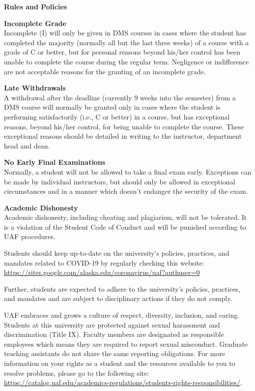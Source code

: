 \documentclass[12pt]{article}
\renewcommand{\emph}[1]{\textsf{\textbf{#1}}}
\newcommand{\localhead}[1]{\par\smallskip\textbf{#1}\nobreak\\}%
\def\heading#1{\localhead{\large\emph{#1}}}
\def\subheading#1{\localhead{\emph{#1}}}
\begin{document}
\heading{Rules and Policies}
\vskip -20pt

\subheading{Incomplete Grade} 
Incomplete (I) will only be given in
  DMS courses in cases where
  the student has completed the majority (normally all but the last
  three weeks) of a course with a grade of C or better, but for
  personal reasons beyond his/her control has been unable to complete
  the course during the regular term. Negligence or indifference are
  not acceptable reasons for the granting of an incomplete
  grade. 

\subheading{Late Withdrawals} 
A withdrawal after the deadline
  (currently 9 weeks into the semester) from a DMS course will
  normally be granted only in cases where the student is performing
  satisfactorily (i.e., C or better) in a course, but has exceptional
  reasons, beyond his/her control, for being unable to complete the
  course. These exceptional reasons should be detailed in writing to
  the instructor, department head and dean.

\subheading{No Early Final Examinations}
 Normally, a student will not be
  allowed to take a final exam early. Exceptions can be made by
  individual instructors, but should only be allowed in exceptional
  circumstances and in a manner which doesn't endanger the security of
  the exam.

\subheading{Academic Dishonesty}
Academic dishonesty, including cheating and plagiarism, will not
be tolerated.  It is a violation of the Student Code of Conduct
and will be punished according to UAF procedures.

 
  Students should keep up-to-date on the university's policies, practices, and mandates related to COVID-19 by regularly checking this website: \url{https://sites.google.com/alaska.edu/coronavirus/uaf?authuser=0}

Further, students are expected to adhere to the university's policies, practices, and mandates and are subject to disciplinary actions if they do not comply.

 UAF embraces and grows a culture of respect, diversity, inclusion, and caring. Students at this university are protected against sexual harassment and discrimination (Title IX). Faculty members are designated as responsible employees which means they are required to report sexual misconduct. Graduate teaching assistants do not share the same reporting obligations. For more information on your rights as a student and the resources available to you to resolve problems, please go to the following site: \url{https://catalog.uaf.edu/academics-regulations/students-rights-responsibilities/}.
\end{document}

